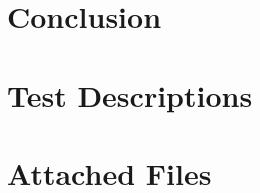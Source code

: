 \documentclass[a4paper]{IEEEtran}
\begin{document}
\section{Conclusion}
    \label{sec:conclusion}
    

\appendices

\section{Test Descriptions}
    \label{sec:tests}
    

\section{Attached Files}
    \label{sec:files}
    



\end{document}
